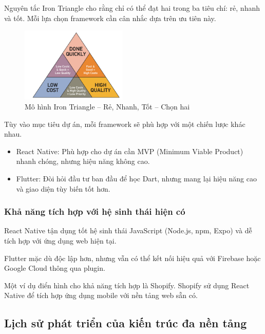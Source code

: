       Nguyên tắc Iron Triangle cho rằng chỉ có thể đạt hai trong ba tiêu chí: rẻ, nhanh và tốt. Mỗi lựa chọn framework cần cân nhắc dựa trên ưu tiên này.
    \vspace{0.5em}

    \begin{figure}[H]
    \centering
    \includegraphics[width=0.45\textwidth]{images/iron_triangle.png}
    \caption{Mô hình Iron Triangle – Rẻ, Nhanh, Tốt – Chọn hai}
    \label{fig:android_ios_tools2}
  \end{figure}
    
      Tùy vào mục tiêu dự án, mỗi framework sẽ phù hợp với một chiến lược khác nhau.
      \setlength{\leftmargini}{1.5cm}
      \begin{itemize}
          \item React Native: Phù hợp cho dự án cần MVP (Minimum Viable Product) nhanh chóng, nhưng hiệu năng không cao.
          \item Flutter: Đòi hỏi đầu tư ban đầu để học Dart, nhưng mang lại hiệu năng cao và giao diện tùy biến tốt hơn.
      \end{itemize}
    

  \subsubsection{Khả năng tích hợp với hệ sinh thái hiện có}
      React Native tận dụng tốt hệ sinh thái JavaScript (Node.js, npm, Expo) và dễ tích hợp với ứng dụng web hiện tại.

      \vspace{0.5em}

      Flutter mặc dù độc lập hơn, nhưng vẫn có thể kết nối hiệu quả với Firebase hoặc Google Cloud thông qua plugin.

      \vspace{0.5em}
  
      Một ví dụ điển hình cho khả năng tích hợp là Shopify. Shopify sử dụng React Native để tích hợp ứng dụng mobile với nền tảng web sẵn có.

\subsection{Lịch sử phát triển của kiến trúc đa nền tảng}

